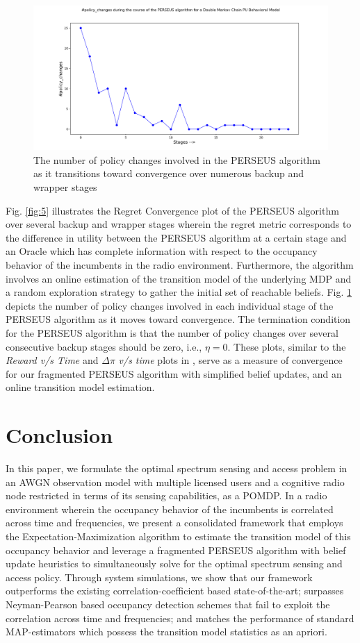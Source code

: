 \documentclass[10pt,twocolumn]{IEEEtran}
\begin{document}
\begin{figure}
    \centering
    \includegraphics[scale=0.25]{Policy_Changes_Plot_04112019.png}
    \caption{The number of policy changes involved in the PERSEUS algorithm as it transitions toward convergence over numerous backup and wrapper stages}
    \label{fig:6}
\end{figure}
Fig. \ref{fig:5} illustrates the Regret Convergence plot of the PERSEUS algorithm over several backup and wrapper stages wherein the regret metric corresponds to the difference in utility between the PERSEUS algorithm at a certain stage and an Oracle which has complete information with respect to the occupancy behavior of the incumbents in the radio environment. Furthermore, the algorithm involves an online estimation of the transition model of the underlying MDP and a random exploration strategy to gather the initial set of reachable beliefs. Fig. \ref{fig:6} depicts the number of policy changes involved in each individual stage of the PERSEUS algorithm as it moves toward convergence. The termination condition for the PERSEUS algorithm is that the number of policy changes over several consecutive backup stages should be zero, i.e., $\eta = 0$. These plots, similar to the \textit{Reward v/s Time} and $\Delta \pi$ \textit{v/s time} plots in \cite{DBLP:journals/corr/abs-1109-2145}, serve as a measure of convergence for our fragmented PERSEUS algorithm with simplified belief updates, and an online transition model estimation.
\section{Conclusion}\label{V}
In this paper, we formulate the optimal spectrum sensing and access problem in an AWGN observation model with multiple licensed users and a cognitive radio node restricted in terms of its sensing capabilities, as a POMDP. In a radio environment wherein the occupancy behavior of the incumbents is correlated across time and frequencies, we present a consolidated framework that employs the Expectation-Maximization algorithm to estimate the transition model of this occupancy behavior and leverage a fragmented PERSEUS algorithm with belief update heuristics to simultaneously solve for the optimal spectrum sensing and access policy. Through system simulations, we show that our framework outperforms the existing correlation-coefficient based state-of-the-art; surpasses Neyman-Pearson based occupancy detection schemes that fail to exploit the correlation across time and frequencies; and matches the performance of standard MAP-estimators which possess the transition model statistics as an apriori.


\end{document}
